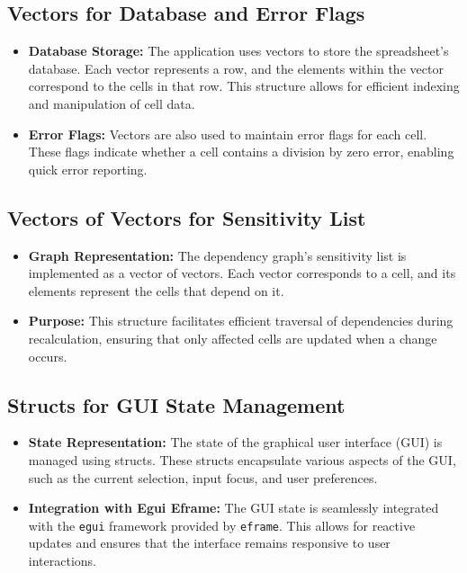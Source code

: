 \documentclass{article}
\begin{document}
\subsection{Vectors for Database and Error Flags}
\begin{itemize}
    \item \textbf{Database Storage:} The application uses vectors to store the spreadsheet's database. Each vector represents a row, and the elements within the vector correspond to the cells in that row. This structure allows for efficient indexing and manipulation of cell data.
    \item \textbf{Error Flags:} Vectors are also used to maintain error flags for each cell. These flags indicate whether a cell contains a division by zero error, enabling quick error reporting.
\end{itemize}

\subsection{Vectors of Vectors for Sensitivity List}
\begin{itemize}
    \item \textbf{Graph Representation:} The dependency graph's sensitivity list is implemented as a vector of vectors. Each vector corresponds to a cell, and its elements represent the cells that depend on it.
    \item \textbf{Purpose:} This structure facilitates efficient traversal of dependencies during recalculation, ensuring that only affected cells are updated when a change occurs.
\end{itemize}

\subsection{Structs for GUI State Management}
\begin{itemize}
    \item \textbf{State Representation:} The state of the graphical user interface (GUI) is managed using structs. These structs encapsulate various aspects of the GUI, such as the current selection, input focus, and user preferences.
    \item \textbf{Integration with Egui Eframe:} The GUI state is seamlessly integrated with the \texttt{egui} framework provided by \texttt{eframe}. This allows for reactive updates and ensures that the interface remains responsive to user interactions.
\end{itemize}
\end{document}
